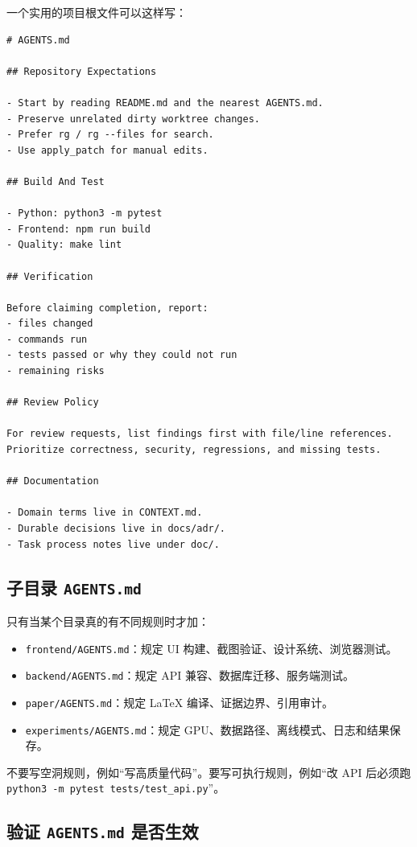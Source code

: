 \documentclass[UTF8,a4paper,11pt,fontset=none]{ctexart}
\newcommand{\file}[1]{\texttt{#1}}
\newcommand{\cmd}[1]{\texttt{#1}}
\begin{document}
一个实用的项目根文件可以这样写：

\begin{lstlisting}
# AGENTS.md

## Repository Expectations

- Start by reading README.md and the nearest AGENTS.md.
- Preserve unrelated dirty worktree changes.
- Prefer rg / rg --files for search.
- Use apply_patch for manual edits.

## Build And Test

- Python: python3 -m pytest
- Frontend: npm run build
- Quality: make lint

## Verification

Before claiming completion, report:
- files changed
- commands run
- tests passed or why they could not run
- remaining risks

## Review Policy

For review requests, list findings first with file/line references.
Prioritize correctness, security, regressions, and missing tests.

## Documentation

- Domain terms live in CONTEXT.md.
- Durable decisions live in docs/adr/.
- Task process notes live under doc/.
\end{lstlisting}

\subsection{子目录 \file{AGENTS.md}}

只有当某个目录真的有不同规则时才加：

\begin{itemize}
  \item \file{frontend/AGENTS.md}：规定 UI 构建、截图验证、设计系统、浏览器测试。
  \item \file{backend/AGENTS.md}：规定 API 兼容、数据库迁移、服务端测试。
  \item \file{paper/AGENTS.md}：规定 LaTeX 编译、证据边界、引用审计。
  \item \file{experiments/AGENTS.md}：规定 GPU、数据路径、离线模式、日志和结果保存。
\end{itemize}

不要写空洞规则，例如“写高质量代码”。要写可执行规则，例如“改 API 后必须跑 \cmd{python3 -m pytest tests/test\_api.py}”。

\subsection{验证 \file{AGENTS.md} 是否生效}
\end{document}
